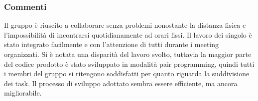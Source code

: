 \subsubsection{Commenti}
Il gruppo è riuscito a collaborare senza problemi nonostante la distanza fisica e l'impossibilità di incontrarsi
quotidianamente ad orari fissi. Il lavoro dei singolo è stato integrato facilmente e con l'attenzione di tutti durante
i meeting organizzati. Si è notata una disparità del lavoro svolto, tuttavia la maggior parte del codice prodotto è
stato sviluppato in modalità pair programming, quindi tutti i membri del gruppo si ritengono soddisfatti per quanto
riguarda la suddivisione dei task. Il processo di sviluppo adottato sembra essere efficiente, ma ancora migliorabile.